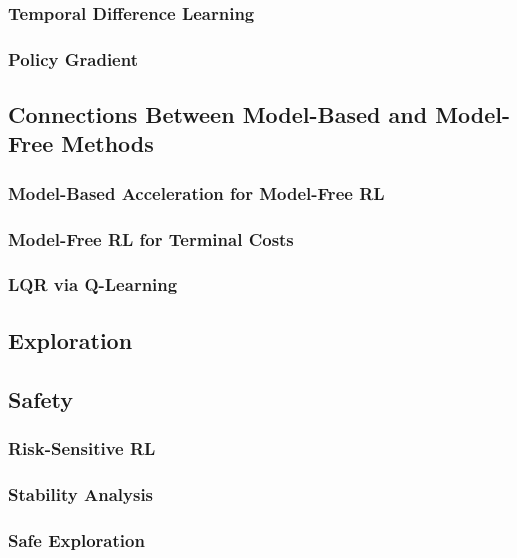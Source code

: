 \subsubsection{Temporal Difference Learning}



\subsubsection{Policy Gradient}


\subsection{Connections Between Model-Based and Model-Free Methods}


\subsubsection{Model-Based Acceleration for Model-Free RL}

\subsubsection{Model-Free RL for Terminal Costs}

\subsubsection{LQR via Q-Learning}


\subsection{Exploration}


\subsection{Safety}

\subsubsection{Risk-Sensitive RL}


\subsubsection{Stability Analysis}


\subsubsection{Safe Exploration}

